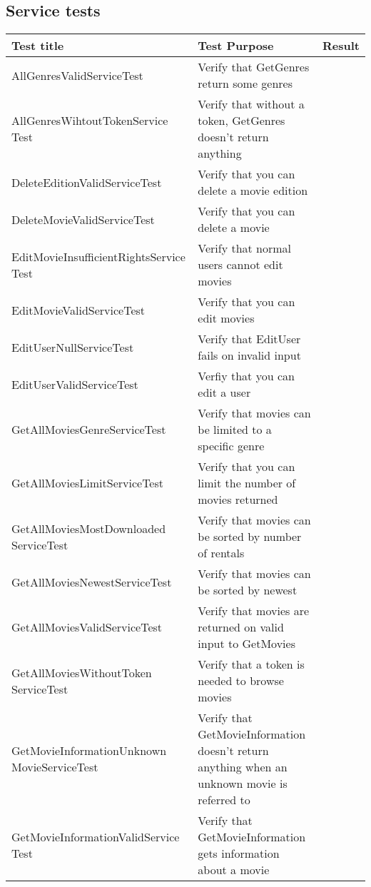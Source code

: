 \subsection{Service tests}
\label{Appendix_Test_Table_Service}
\begin{centering}
\begin{longtable}{| p{5 cm} | p{9 cm} | c |}
\hline
Test title & Test Purpose & Result\\
\hline
AllGenresValidServiceTest & Verify that GetGenres return some genres & \\
\hline
AllGenresWihtoutTokenService Test & Verify that without a token, GetGenres doesn't return anything & \\
\hline
DeleteEditionValidServiceTest & Verify that you can delete a movie edition & \\
\hline
DeleteMovieValidServiceTest & Verify that you can delete a movie & \\
\hline
EditMovieInsufficientRightsService Test & Verify that normal users cannot edit movies & \\
\hline
EditMovieValidServiceTest & Verify that you can edit movies & \\
\hline
EditUserNullServiceTest & Verify that EditUser fails on invalid input & \\
\hline
EditUserValidServiceTest & Verfiy that you can edit a user & \\
\hline
GetAllMoviesGenreServiceTest & Verify that movies can be limited to a specific genre & \\
\hline
GetAllMoviesLimitServiceTest & Verify that you can limit the number of movies returned & \\
\hline
GetAllMoviesMostDownloaded ServiceTest & Verify that movies can be sorted by number of rentals & \\
\hline
GetAllMoviesNewestServiceTest & Verify that movies can be sorted by newest & \\
\hline
GetAllMoviesValidServiceTest & Verify that movies are returned on valid input to GetMovies & \\
\hline
GetAllMoviesWithoutToken ServiceTest & Verify that a token is needed to browse movies & \\
\hline
GetMovieInformationUnknown MovieServiceTest & Verify that GetMovieInformation doesn't return anything when an unknown movie is referred to & \\
\hline
GetMovieInformationValidService Test & Verify that GetMovieInformation gets information about a movie & \\

\end{longtable}
\end{centering}
